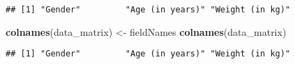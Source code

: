 \documentclass[
]{article}
\newenvironment{Shaded}{\begin{snugshade}}{\end{snugshade}}
\newcommand{\FunctionTok}[1]{\textcolor[rgb]{0.13,0.29,0.53}{\textbf{#1}}}
\newcommand{\NormalTok}[1]{#1}
\newcommand{\OtherTok}[1]{\textcolor[rgb]{0.56,0.35,0.01}{#1}}
\begin{document}
\begin{verbatim}
## [1] "Gender"         "Age (in years)" "Weight (in kg)"
\end{verbatim}

\begin{Shaded}
\begin{Highlighting}[]
\FunctionTok{colnames}\NormalTok{(data\_matrix) }\OtherTok{\textless{}{-}}\NormalTok{ fieldNames}
\FunctionTok{colnames}\NormalTok{(data\_matrix)}
\end{Highlighting}
\end{Shaded}

\begin{verbatim}
## [1] "Gender"         "Age (in years)" "Weight (in kg)"
\end{verbatim}
\end{document}
